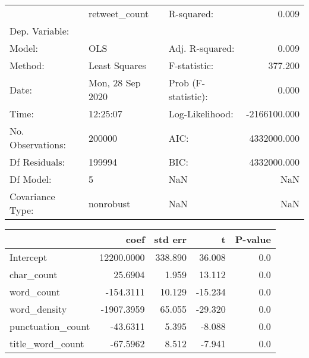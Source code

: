 
\begin{tabular}{lllr}
\toprule
{} &     retweet\_count &           R-squared: &        0.009 \\
Dep. Variable:    &                   &                      &              \\
\midrule
Model:            &               OLS &      Adj. R-squared: &        0.009 \\
Method:           &     Least Squares &         F-statistic: &      377.200 \\
Date:             &  Mon, 28 Sep 2020 &  Prob (F-statistic): &        0.000 \\
Time:             &          12:25:07 &      Log-Likelihood: & -2166100.000 \\
No. Observations: &            200000 &                 AIC: &  4332000.000 \\
Df Residuals:     &            199994 &                 BIC: &  4332000.000 \\
Df Model:         &                 5 &                  NaN &          NaN \\
Covariance Type:  &         nonrobust &                  NaN &          NaN \\
\bottomrule
\end{tabular}

\begin{tabular}{lrrrr}
\toprule
{} &        coef &  std err &       t &  P-value \\
\midrule
Intercept         &  12200.0000 &  338.890 &  36.008 &      0.0 \\
char\_count        &     25.6904 &    1.959 &  13.112 &      0.0 \\
word\_count        &   -154.3111 &   10.129 & -15.234 &      0.0 \\
word\_density      &  -1907.3959 &   65.055 & -29.320 &      0.0 \\
punctuation\_count &    -43.6311 &    5.395 &  -8.088 &      0.0 \\
title\_word\_count  &    -67.5962 &    8.512 &  -7.941 &      0.0 \\
\bottomrule
\end{tabular}


